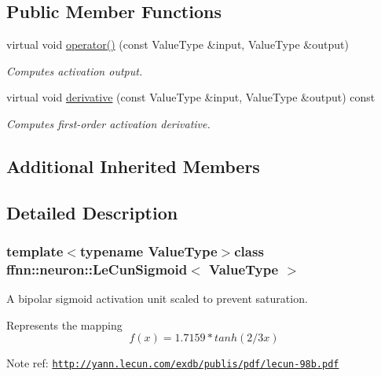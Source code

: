 \subsection*{Public Member Functions}
\begin{DoxyCompactItemize}
\item 
virtual void \hyperlink{classffnn_1_1neuron_1_1_le_cun_sigmoid_ae1a0a4b086a8983f31fb320e7c3088dc}{operator()} (const Value\-Type \&input, Value\-Type \&output)
\begin{DoxyCompactList}\small\item\em Computes activation output. \end{DoxyCompactList}\item 
virtual void \hyperlink{classffnn_1_1neuron_1_1_le_cun_sigmoid_a4802deb108ab8ca6a67a4d7d55124fb2}{derivative} (const Value\-Type \&input, Value\-Type \&output) const 
\begin{DoxyCompactList}\small\item\em Computes first-\/order activation derivative. \end{DoxyCompactList}\end{DoxyCompactItemize}
\subsection*{Additional Inherited Members}


\subsection{Detailed Description}
\subsubsection*{template$<$typename Value\-Type$>$class ffnn\-::neuron\-::\-Le\-Cun\-Sigmoid$<$ Value\-Type $>$}

A bipolar sigmoid activation unit scaled to prevent saturation. 

Represents the mapping \[ f(x) = 1.7159 * tanh(2/3 x) \]

\begin{DoxyNote}{Note}
ref\-: \href{http://yann.lecun.com/exdb/publis/pdf/lecun-98b.pdf}{\tt http\-://yann.\-lecun.\-com/exdb/publis/pdf/lecun-\/98b.\-pdf} 
\end{DoxyNote}


